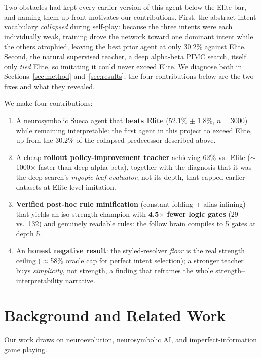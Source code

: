 \documentclass[runningheads]{llncs}
\begin{document}
Two obstacles had kept every earlier version of this agent below the Elite bar,
and naming them up front motivates our contributions. First, the abstract intent
vocabulary \emph{collapsed} during self-play: because the three intents were each
individually weak, training drove the network toward one dominant intent while
the others atrophied, leaving the best prior agent at only 30.2\% against Elite.
Second, the natural supervised teacher, a deep alpha-beta PIMC search, itself
only \emph{tied} Elite, so imitating it could never exceed Elite. We diagnose
both in Sections~\ref{sec:method} and~\ref{sec:results}; the four contributions
below are the two fixes and what they revealed.

We make four contributions:

\begin{enumerate}
\item A neurosymbolic Sueca agent that \textbf{beats Elite} (52.1\% $\pm$ 1.8\%,
  $n=3000$) while remaining interpretable: the first agent in this project to
  exceed Elite, up from the 30.2\% of the collapsed predecessor described above.
\item A cheap \textbf{rollout policy-improvement teacher} achieving 62\% vs.\
  Elite ($\sim$1000$\times$ faster than deep alpha-beta), together with the diagnosis
  that it was the deep search's \emph{myopic leaf evaluator}, not its depth,
  that capped earlier datasets at Elite-level imitation.
\item \textbf{Verified post-hoc rule minification} (constant-folding + alias
  inlining) that yields an iso-strength champion with \textbf{4.5$\times$ fewer
  logic gates} (29 vs.\ 132) and genuinely readable rules: the follow brain
  compiles to 5 gates at depth 5.
\item An \textbf{honest negative result}: the styled-resolver \emph{floor} is
  the real strength ceiling ($\approx$58\% oracle cap for perfect intent
  selection); a stronger teacher buys \emph{simplicity}, not strength, a
  finding that reframes the whole strength--interpretability narrative.
\end{enumerate}

\section{Background and Related Work}

Our work draws on neuroevolution, neurosymbolic AI, and imperfect-information
game playing.
\end{document}
